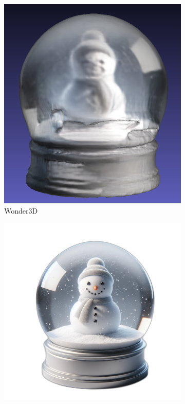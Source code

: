 \begin{figure}[ht]
\begin{subfigure}[b]{0.27\textwidth}
        \includegraphics[width=\textwidth]{etc/a detailed rendering of a snow globe containing a snowman/wonder3D/wonder3d_globe_result.png}
        \caption{Wonder3D}
        \vspace{0.1cm}
    \end{subfigure}
    \begin{subfigure}[b]{0.32\textwidth}
        \centering
        \includegraphics[width=\textwidth]{etc/Images/snowGlobe.png}

\end{subfigure}
\end{figure}
